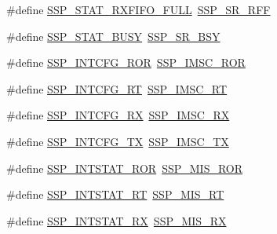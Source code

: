 \begin{DoxyCompactItemize}
\item 
\#define \hyperlink{group___s_s_p___public___macros_ga12ae92a4672cd13f9e3c4b1330384d0e}{S\+S\+P\+\_\+\+S\+T\+A\+T\+\_\+\+R\+X\+F\+I\+F\+O\+\_\+\+F\+U\+LL}~\hyperlink{group___s_s_p___private___macros_gacb3442f8b9ec2dbb3be63f154cc58940}{S\+S\+P\+\_\+\+S\+R\+\_\+\+R\+FF}
\item 
\#define \hyperlink{group___s_s_p___public___macros_ga618e52f34a11a7e9414d18a2e56be63c}{S\+S\+P\+\_\+\+S\+T\+A\+T\+\_\+\+B\+U\+SY}~\hyperlink{group___s_s_p___private___macros_gac57c889d98458cfbde35f0ab63b499c2}{S\+S\+P\+\_\+\+S\+R\+\_\+\+B\+SY}
\item 
\#define \hyperlink{group___s_s_p___public___macros_ga7db87dea06af8ba8368be4dcccfd97d3}{S\+S\+P\+\_\+\+I\+N\+T\+C\+F\+G\+\_\+\+R\+OR}~\hyperlink{group___s_s_p___private___macros_gaa004d331d2d6bf2fc123de80d6e18a95}{S\+S\+P\+\_\+\+I\+M\+S\+C\+\_\+\+R\+OR}
\item 
\#define \hyperlink{group___s_s_p___public___macros_ga4716c2b633cc0698f6e515ffb7abedbd}{S\+S\+P\+\_\+\+I\+N\+T\+C\+F\+G\+\_\+\+RT}~\hyperlink{group___s_s_p___private___macros_ga0396910287899ff6ab730425a8a332c7}{S\+S\+P\+\_\+\+I\+M\+S\+C\+\_\+\+RT}
\item 
\#define \hyperlink{group___s_s_p___public___macros_ga20c9695e3dde083db7f54d6715c5573c}{S\+S\+P\+\_\+\+I\+N\+T\+C\+F\+G\+\_\+\+RX}~\hyperlink{group___s_s_p___private___macros_ga9f4d1fa05f49655cc6e5548b11dfe092}{S\+S\+P\+\_\+\+I\+M\+S\+C\+\_\+\+RX}
\item 
\#define \hyperlink{group___s_s_p___public___macros_ga12314c10c13b5663431e2f3d794d8e6d}{S\+S\+P\+\_\+\+I\+N\+T\+C\+F\+G\+\_\+\+TX}~\hyperlink{group___s_s_p___private___macros_ga0e1c817c6d276a0fd17b0c4d21668818}{S\+S\+P\+\_\+\+I\+M\+S\+C\+\_\+\+TX}
\item 
\#define \hyperlink{group___s_s_p___public___macros_ga849060f3ae22fc69e37410b1607c6d49}{S\+S\+P\+\_\+\+I\+N\+T\+S\+T\+A\+T\+\_\+\+R\+OR}~\hyperlink{group___s_s_p___private___macros_ga5ab078b780d3ab049afbc4bf1d548164}{S\+S\+P\+\_\+\+M\+I\+S\+\_\+\+R\+OR}
\item 
\#define \hyperlink{group___s_s_p___public___macros_gaec7fec10a4c64bd3391c91c832e040c5}{S\+S\+P\+\_\+\+I\+N\+T\+S\+T\+A\+T\+\_\+\+RT}~\hyperlink{group___s_s_p___private___macros_gac656007811dd29f2448a6a534aee04a3}{S\+S\+P\+\_\+\+M\+I\+S\+\_\+\+RT}
\item 
\#define \hyperlink{group___s_s_p___public___macros_gacf36c76c863756c8bfda4057637cc034}{S\+S\+P\+\_\+\+I\+N\+T\+S\+T\+A\+T\+\_\+\+RX}~\hyperlink{group___s_s_p___private___macros_gaae1efd94a8b66679f1793a3c5458a777}{S\+S\+P\+\_\+\+M\+I\+S\+\_\+\+RX}

\end{DoxyCompactItemize}
